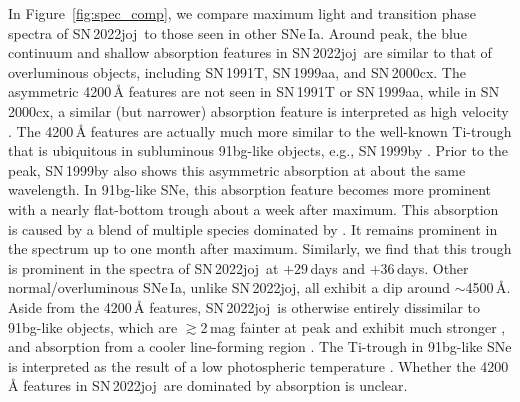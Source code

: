 \documentclass[twocolumn]{aastex631}
\newcommand{\sn}{SN\,2022joj}
\begin{document}
\begin{CJK*}{UTF8}{gbsn}
In Figure~\ref{fig:spec_comp}, we compare maximum light and transition phase spectra of \sn\ to those seen in other SNe\,Ia. Around peak, the blue continuum and shallow absorption features in \sn\ are similar to that of overluminous objects, including SN\,1991T, SN\,1999aa, and SN\,2000cx. The asymmetric 4200\,\r{A} features are not seen in SN\,1991T or SN\,1999aa, while in SN\,2000cx, a similar (but narrower) absorption feature is interpreted as high velocity  \citep{Branch_00cx_2004}. The 4200\,\r{A} features are actually much more similar to the well-known Ti-trough that is ubiquitous in subluminous 91bg-like objects, e.g., SN\,1999by \citep{Arbour_1999}. Prior to the peak, SN\,1999by also shows this asymmetric absorption at about the same wavelength. In 91bg-like SNe, this absorption feature becomes more prominent with a nearly flat-bottom trough about a week after maximum. This absorption is caused by a blend of multiple species dominated by  \citep{Filippenko_91bg_1992,Mazzali_1997}. It remains prominent in the spectrum up to one month after maximum. Similarly, we find that this trough is prominent in the spectra of \sn\ at $+29$\,days and $+36$\,days. Other normal/overluminous SNe\,Ia, unlike \sn, all exhibit a dip around $\sim$4500\,\r{A}. Aside from the 4200\,\r{A} features, \sn\ is otherwise entirely dissimilar to 91bg-like objects, which are $\gtrsim$2\,mag fainter at peak and exhibit much stronger ,  and  absorption from a cooler line-forming region \citep{Filippenko_91bg_1992}. The Ti-trough in 91bg-like SNe is interpreted as the result of a low photospheric temperature \citep{Mazzali_1997}. Whether the 4200\,\r{A} features in \sn\ are dominated by  absorption is unclear.


\end{CJK*}
\end{document}
